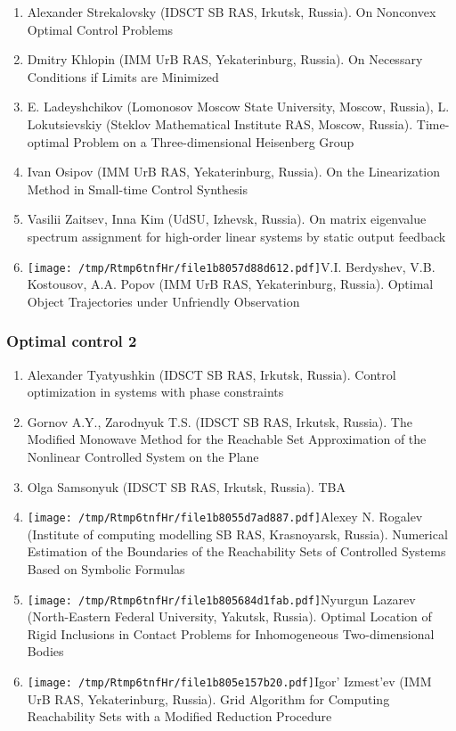 \documentclass[
]{article}
\providecommand{\tightlist}{%
  \setlength{\itemsep}{0pt}\setlength{\parskip}{0pt}}
\begin{document}
\begin{enumerate}
\def\labelenumi{\arabic{enumi}.}
\tightlist
\item
  Alexander Strekalovsky (IDSCT SB RAS, Irkutsk, Russia). On Nonconvex
  Optimal Control Problems
\item
  Dmitry Khlopin (IMM UrB RAS, Yekaterinburg, Russia). On Necessary
  Conditions if Limits are Minimized
\item
  E. Ladeyshchikov (Lomonosov Moscow State University, Moscow, Russia),
  L. Lokutsievskiy (Steklov Mathematical Institute RAS, Moscow, Russia).
  Time-optimal Problem on a Three-dimensional Heisenberg Group
\item
  Ivan Osipov (IMM UrB RAS, Yekaterinburg, Russia). On the Linearization
  Method in Small-time Control Synthesis
\item
  Vasilii Zaitsev, Inna Kim (UdSU, Izhevsk, Russia). On matrix
  eigenvalue spectrum assignment for high-order linear systems by static
  output feedback
\item
  \protect\texttt{[image: /tmp/Rtmp6tnfHr/file1b8057d88d612.pdf]}V.I.
  Berdyshev, V.B. Kostousov, A.A. Popov (IMM UrB RAS, Yekaterinburg,
  Russia). Optimal Object Trajectories under Unfriendly Observation
\end{enumerate}

\hypertarget{oc2}{%
\subsubsection{Optimal control 2}\label{oc2}}

\begin{enumerate}
\def\labelenumi{\arabic{enumi}.}
\tightlist
\item
  Alexander Tyatyushkin (IDSCT SB RAS, Irkutsk, Russia). Control
  optimization in systems with phase constraints
\item
  Gornov A.Y., Zarodnyuk T.S. (IDSCT SB RAS, Irkutsk, Russia). The
  Modiﬁed Monowave Method for the Reachable Set Approximation of the
  Nonlinear Controlled System on the Plane
\item
  Olga Samsonyuk (IDSCT SB RAS, Irkutsk, Russia). TBA
\item
  \protect\texttt{[image: /tmp/Rtmp6tnfHr/file1b8055d7ad887.pdf]}Alexey
  N. Rogalev (Institute of computing modelling SB RAS, Krasnoyarsk,
  Russia). Numerical Estimation of the Boundaries of the Reachability
  Sets of Controlled Systems Based on Symbolic Formulas
\item
  \protect\texttt{[image: /tmp/Rtmp6tnfHr/file1b805684d1fab.pdf]}Nyurgun
  Lazarev (North-Eastern Federal University, Yakutsk, Russia). Optimal
  Location of Rigid Inclusions in Contact Problems for Inhomogeneous
  Two-dimensional Bodies
\item
  \protect\texttt{[image: /tmp/Rtmp6tnfHr/file1b805e157b20.pdf]}Igor'
  Izmest'ev (IMM UrB RAS, Yekaterinburg, Russia). Grid Algorithm for
  Computing Reachability Sets with a Modified Reduction Procedure
\end{enumerate}
\end{document}
